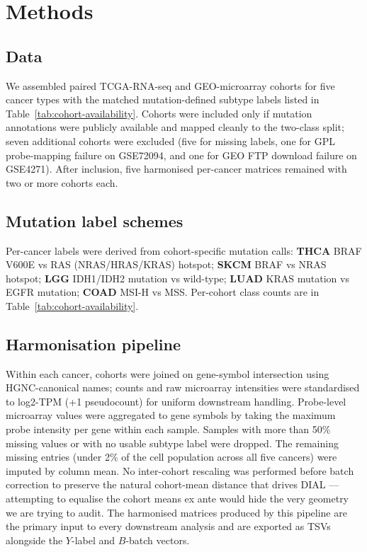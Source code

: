 \documentclass[11pt,a4paper]{article}
\begin{document}
\section{Methods}
\label{sec:methods}

\subsection{Data}
We assembled paired TCGA-RNA-seq and GEO-microarray cohorts for five
cancer types with the matched mutation-defined subtype labels listed
in Table~\ref{tab:cohort-availability}. Cohorts were included only if
mutation annotations were publicly available and mapped cleanly to the
two-class split; seven additional cohorts were excluded
(five for missing labels, one for GPL probe-mapping failure on
GSE72094, and one for GEO FTP download failure on GSE4271). After
inclusion, five harmonised per-cancer matrices remained with two or
more cohorts each.



\subsection{Mutation label schemes}
Per-cancer labels were derived from cohort-specific mutation calls:
\textbf{THCA} BRAF V600E vs RAS (NRAS/HRAS/KRAS) hotspot; \textbf{SKCM}
BRAF vs NRAS hotspot; \textbf{LGG} IDH1/IDH2 mutation vs wild-type;
\textbf{LUAD} KRAS mutation vs EGFR mutation; \textbf{COAD} MSI-H vs
MSS. Per-cohort class counts are in
Table~\ref{tab:cohort-availability}.

\subsection{Harmonisation pipeline}
Within each cancer, cohorts were joined on gene-symbol intersection
using HGNC-canonical names; counts and raw microarray intensities were
standardised to log2-TPM (+1 pseudocount) for uniform downstream
handling. Probe-level microarray values were aggregated to
gene symbols by taking the maximum probe intensity per gene within
each sample. Samples with more than 50\% missing values or with no
usable subtype label were dropped. The remaining missing entries
(under 2\% of the cell population across all five cancers) were
imputed by column mean. No inter-cohort rescaling was performed
before batch correction to preserve the natural cohort-mean distance
that drives DIAL --- attempting to equalise the cohort means ex ante
would hide the very geometry we are trying to audit. The harmonised
matrices produced by this pipeline are the primary input to every
downstream analysis and are exported as TSVs alongside the
$Y$-label and $B$-batch vectors.
\end{document}
